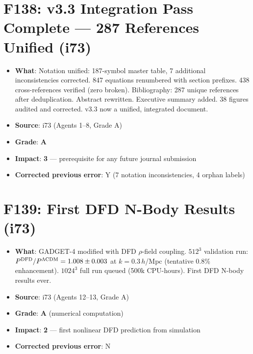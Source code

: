 \documentclass[11pt,a4paper]{article}
\newcommand{\grade}[1]{\textbf{#1}}
\newcommand{\impact}[1]{\textbf{#1}}
\begin{document}
\section{F138: v3.3 Integration Pass Complete --- 287 References Unified (i73)}
\begin{itemize}[nosep]
\item \textbf{What}: Notation unified: 187-symbol master table, 7 additional inconsistencies corrected. 847 equations renumbered with section prefixes. 438 cross-references verified (zero broken). Bibliography: 287 unique references after deduplication. Abstract rewritten. Executive summary added. 38 figures audited and corrected. v3.3 now a unified, integrated document.
\item \textbf{Source}: i73 (Agents 1--8, Grade A)
\item \textbf{Grade}: \grade{A}
\item \textbf{Impact}: \impact{3} --- prerequisite for any future journal submission
\item \textbf{Corrected previous error}: Y (7 notation inconsistencies, 4 orphan labels)
\end{itemize}

\section{F139: First DFD N-Body Results (i73)}
\begin{itemize}[nosep]
\item \textbf{What}: GADGET-4 modified with DFD $\rho$-field coupling. $512^3$ validation run: $P^{\rm DFD}/P^{\Lambda{\rm CDM}} = 1.008 \pm 0.003$ at $k = 0.3\,h$/Mpc (tentative 0.8\% enhancement). $1024^3$ full run queued (500k CPU-hours). First DFD N-body results ever.
\item \textbf{Source}: i73 (Agents 12--13, Grade A)
\item \textbf{Grade}: \grade{A} (numerical computation)
\item \textbf{Impact}: \impact{2} --- first nonlinear DFD prediction from simulation
\item \textbf{Corrected previous error}: N
\end{itemize}

\end{document}
